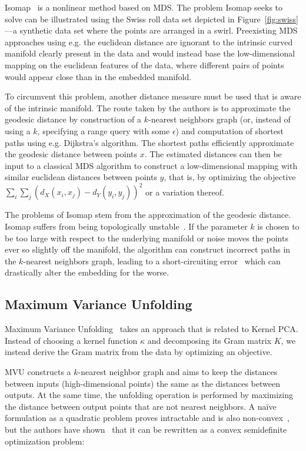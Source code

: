 Isomap~\cite{isomap} is a nonlinear method based on MDS. The problem Isomap seeks to solve can
be illustrated using the Swiss roll data set depicted in Figure~\ref{fig:swiss}---a synthetic data set where the points are
arranged in a swirl. Preexisting MDS approaches using e.g. the euclidean distance are ignorant
to the intrinsic curved manifold clearly present in the data and would instead base the low-dimensional
mapping on the euclidean features of the data, where different pairs of points would appear close than
in the embedded manifold.

To circumvent this problem, another distance measure must be used that is aware
of the intrinsic manifold. The
route taken by the authors is to approximate the geodesic distance by
construction of  a $k$-nearest neighbors graph (or, instead of using a $k$,
specifying a range query with some $\epsilon$) and computation of shortest
paths using e.g. Dijkstra's algorithm. The shortest paths efficiently
approximate the geodesic distance between points $x$. The estimated distances
can then be input to a classical MDS algorithm to construct a low-dimensional
mapping with similar euclidean distances between points $y$, that is, by optimizing
the objective $\sum_i \sum_j (d_X(x_i, x_j) - d_Y(y_i, y_j))^2$ or a variation
thereof.

The problems of Isomap stem from the approximation of the geodesic distance. Isomap
suffers from being topologically unstable~\cite{isomap_stability}. If the parameter $k$
is chosen to be too large with respect to the underlying manifold or noise moves the
points ever so slightly off the manifold, the algorithm can construct incorrect
paths in the $k$-nearest neighbors graph, leading to a short-circuiting error~\cite{essential_loops}
which can drastically alter the embedding for the worse.

\subsection{Maximum Variance Unfolding}

Maximum Variance Unfolding~\cite{mvu} takes an approach that is related to Kernel PCA.
Instead of choosing a kernel function $\kappa$ and decomposing its Gram matrix $K$, we
instead derive the Gram matrix from the data by optimizing an objective.

MVU constructs a $k$-nearest neighbor graph and aims to keep the distances
between inputs (high-dimensional points) the same as the distances between
outputs. At the same time, the unfolding operation is performed by maximizing
the distance between output points that are not nearest neighbors. A na\"ive
formulation as a quadratic problem proves intractable and is also
non-convex~\cite{intro_mvu}, but the authors have shown~\cite{mvu} that it can
be rewritten as a convex semidefinite optimization problem:

